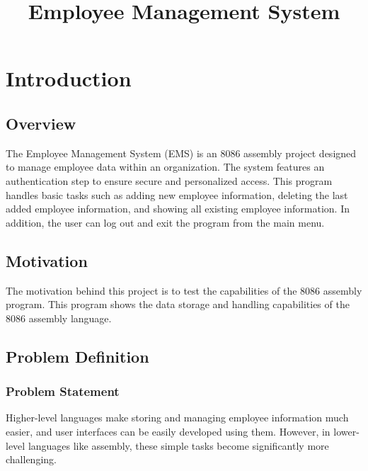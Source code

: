 \documentclass[12pt]{report}
\title{Employee Management System}
\begin{document}
    
    \tableofcontents
  


\newpage
\chapter{Introduction}

\section{Overview}
The Employee Management System (EMS) is an 8086 assembly project designed to manage employee data within an organization. The system features an authentication step to ensure secure and personalized access. This program handles basic tasks such as adding new employee information, deleting the last added employee information, and showing all existing employee information. In addition, the user can log out and exit the program from the main menu.

\section{Motivation}
The motivation behind this project is to test the capabilities of the 8086 assembly program. This program shows the data storage and handling capabilities of the 8086 assembly language. 

\section{Problem Definition}

\subsection{Problem Statement}

Higher-level languages make storing and managing employee information much easier, and user interfaces can be easily developed using them. However, in lower-level languages like assembly, these simple tasks become significantly more challenging.
\end{document}
